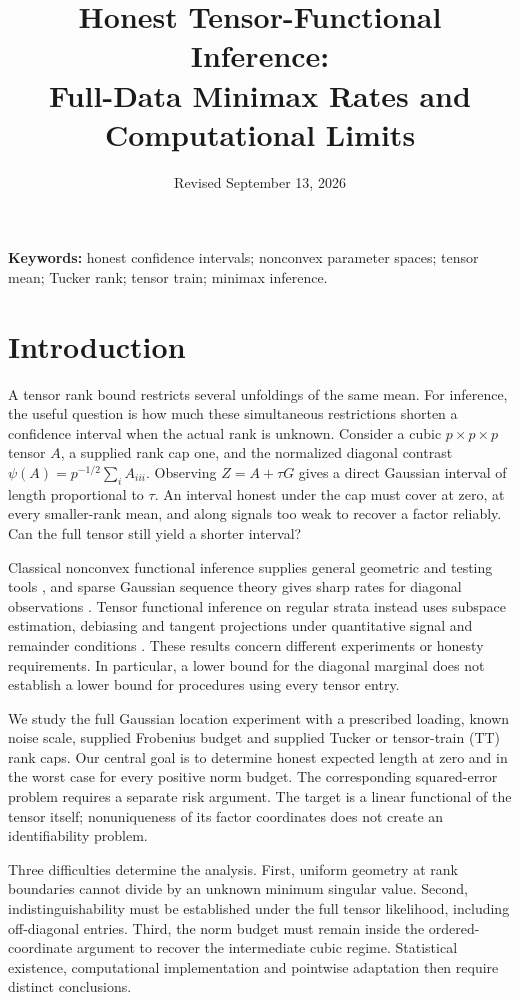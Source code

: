 \documentclass[11pt]{article}
\title{Honest Tensor-Functional Inference:\\Full-Data Minimax Rates and Computational Limits}
\author{}\date{Revised September 13, 2026}
\begin{document}
\maketitle

\noindent\textbf{Keywords:} honest confidence intervals; nonconvex parameter spaces; tensor mean; Tucker rank; tensor train; minimax inference.

\section{Introduction}\label{sec:intro}
A tensor rank bound restricts several unfoldings of the same mean. For inference, the useful question is how much these simultaneous restrictions shorten a confidence interval when the actual rank is unknown. Consider a cubic $p\times p\times p$ tensor $A$, a supplied rank cap one, and the normalized diagonal contrast $\psi(A)=p^{-1/2}\sum_i A_{iii}$. Observing $Z=A+\tau G$ gives a direct Gaussian interval of length proportional to $\tau$. An interval honest under the cap must cover at zero, at every smaller-rank mean, and along signals too weak to recover a factor reliably. Can the full tensor still yield a shorter interval?

Classical nonconvex functional inference supplies general geometric and testing tools \citep{cailownonconvex2004,cailow2004}, and sparse Gaussian sequence theory gives sharp rates for diagonal observations \citep{collier2017}. Tensor functional inference on regular strata instead uses subspace estimation, debiasing and tangent projections under quantitative signal and remainder conditions \citep{xu2025}. These results concern different experiments or honesty requirements. In particular, a lower bound for the diagonal marginal does not establish a lower bound for procedures using every tensor entry.

We study the full Gaussian location experiment with a prescribed loading, known noise scale, supplied Frobenius budget and supplied Tucker or tensor-train (TT) rank caps. Our central goal is to determine honest expected length at zero and in the worst case for every positive norm budget. The corresponding squared-error problem requires a separate risk argument. The target is a linear functional of the tensor itself; nonuniqueness of its factor coordinates does not create an identifiability problem.

Three difficulties determine the analysis. First, uniform geometry at rank boundaries cannot divide by an unknown minimum singular value. Second, indistinguishability must be established under the full tensor likelihood, including off-diagonal entries. Third, the norm budget must remain inside the ordered-coordinate argument to recover the intermediate cubic regime. Statistical existence, computational implementation and pointwise adaptation then require distinct conclusions.
\end{document}
